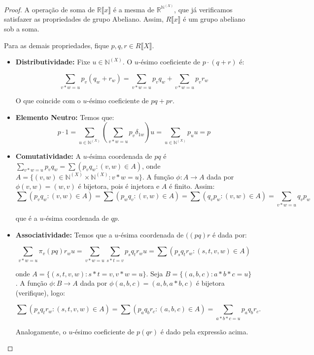 \begin{proof}
    A operação de soma de $\mathbb R\llbracket x \rrbracket$ é a mesma de $\mathbb R^{\mathbb N^{(X)}}$, que já verificamos satisfazer as propriedades de grupo Abeliano. Assim, $R\llbracket x \rrbracket$ é um grupo abeliano sob a soma.

    Para as demais propriedades, fique $p, q, r \in R\llbracket X \rrbracket$.
    \begin{itemize}
        \item \textbf{Distributividade:} Fixe $u \in \mathbb N^{(X)}$. O $u$-ésimo coeficiente de $p\cdot (q+r)$ é:
        
        \[\sum_{v*w=u} p_{v}(q_w+r_w)=\sum_{v*w=u}p_vq_w+\sum_{v*w=u}p_vr_w\]

        O que coincide com o $u$-ésimo coeficiente de $pq+pr$.
        \item \textbf{Elemento Neutro:} Temos que:
        \[p\cdot 1=\sum_{u \in \mathbb N^{(X)}}\left(\sum_{v*w=u} p_{v}\delta_{1w}\right)u=\sum_{u \in \mathbb N^{(X)}}p_{u}u=p\]

        \item \textbf{Comutatividade:} A $u$-ésima coordenada de $pq$ é $\sum_{v*w=u} p_vq_w=\sum(p_vq_w: (v, w)\in A)$, onde $A=\{(v, w)\in \mathbb N^{(X)}\times \mathbb N^{(X)}: v*w=u\}$. A função $\phi: A\rightarrow A$ dada por $\phi(v, w)=(w, v)$ é bijetora, pois é injetora e $A$ é finito. Assim:
        \[\sum(p_vq_w: (v, w)\in A)=\sum(p_wq_v: (v, w)\in A)=\sum(q_vp_w: (v, w)\in A)=\sum_{v*w=u}q_vp_w\]

        que é a $u$-ésima coordenada de $qp$.
    
        \item \textbf{Associatividade:} Temos que a $u$-ésima coordenada de $((pq)r$ é dada por:

        \[\sum_{v*w=u}\pi_v(pq)r_wu=\sum_{v*w=u}\sum_{s*t=v}p_sq_tr_wu=\sum(p_sq_tr_w: (s, t, v, w)\in A)\]

        onde $A=\{(s, t, v, w): s*t=v, v*w=u\}$. Seja $B=\{(a, b, c): a*b*c=u\}$. A função $\phi:B\rightarrow A$ dada por $\phi(a, b, c)=(a, b, a*b, c)$ é bijetora (verifique), logo:

        \[\sum(p_sq_tr_w: (s, t, v, w)\in A)=\sum(p_aq_br_c: (a, b, c)\in A)=\sum_{a*b*c=u}p_aq_br_c.\]

        Analogamente, o $u$-ésimo coeficiente de $p(qr)$ é dado pela expressão acima.
    \end{itemize}
\end{proof}

